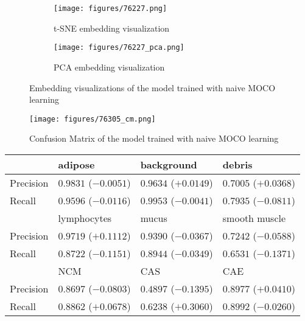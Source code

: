 \documentclass[12pt,twoside]{report}
\begin{document}
\begin{figure}
\centering
    \begin{subfigure}{.45\textwidth}
      \centering
      \texttt{[image: figures/76227.png]}
      \caption{t-SNE embedding visualization}
    \end{subfigure}%
    \begin{subfigure}{.45\textwidth}
      \centering
      \texttt{[image: figures/76227\_pca.png]}
      \caption{PCA embedding visualization}
    \end{subfigure}
    \caption{Embedding visualizations of the model trained with naive MOCO learning}
    \label{fig:moco_embedding}
\end{figure}

\begin{figure}
    \centering
    \texttt{[image: figures/76305\_cm.png]}
    \caption{Confusion Matrix of the model trained with naive MOCO learning}
    \label{fig:naiveMOCO_cm}
\end{figure}

\begin{table}[]
    \centering
    \begin{tabular}{llll}
\toprule
 & adipose & background & debris \\
\hline
Precision & $0.9831$ ($-0.0051$) & $0.9634$ ($+0.0149$) & $0.7005$ ($+0.0368$) \\
Recall & $0.9596$ ($-0.0116$) & $0.9953$ ($-0.0041$) & $0.7935$ ($-0.0811$) \\
\toprule
 & lymphocytes & mucus & smooth muscle \\
\hline
Precision & $0.9719$ ($+0.1112$) & $0.9390$ ($-0.0367$) & $0.7242$ ($-0.0588$) \\
Recall & $0.8722$ ($-0.1151$) & $0.8944$ ($-0.0349$) & $0.6531$ ($-0.1371$) \\
\toprule
 & NCM & CAS & CAE \\
\hline
Precision & $0.8697$ ($-0.0803$) & $0.4897$ ($-0.1395$) & $0.8977$ ($+0.0410$) \\
Recall & $0.8862$ ($+0.0678$) & $0.6238$ ($+0.3060$) & $0.8992$ ($-0.0260$) \\
    \bottomrule
    \end{tabular}
    \captionsetup{type=table}
    \label{tab:naiveMOCO_preci_recall}
\end{table}
\end{document}
